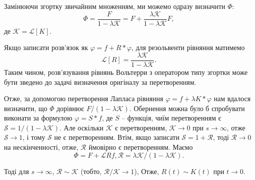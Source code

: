 \documentclass[14pt,twoside]{extreport}
\theoremstyle{mystyle}
\numberwithin{equation}{chapter}
\begin{document}
Замінюючи згортку звичайним множенням, ми можемо одразу визначити $\Phi$:
\begin{equation*}
	\Phi=\dfrac{F}{1-\lambda\mathcal{K}} = F + \dfrac{\lambda\mathcal{K}}{1-\lambda\mathcal{K}}F,
\end{equation*}
де $\mathcal{K}=\mathcal{L}[K]$.

Якщо записати розв'язок як $\varphi = f + R*\varphi$, для резольвенти рівняння матимемо
\begin{equation*}
	\mathcal{L}[R]=\dfrac{\lambda\mathcal{K}}{1-\lambda\mathcal{K}}.
\end{equation*}
Таким чином, розв'язування рівнянь Вольтерри з оператором типу згортки може бути зведено до задачі визначення оригіналу за перетворенням.

Отже, за допомогою перетворення Лапласа рівняння $\varphi=f+\lambda K*\varphi$ нам вдалося визначити, що $\Phi$ дорівнює $F/(1-\lambda\mathcal{K})$. Обернення можна було б спробувати виконати за формулою $\varphi=S*f$, де $S$ -- функція, чиїм перетворенням є $\mathcal{S}=1/(1-\lambda\mathcal{K})$. Але оскільки $\mathcal{K}$ є перетворенням, $\mathcal{K}\to  0$ при $ s\to \infty$, отже $\mathcal{S}\to  1$, і тому $\mathcal{S}$ не є перетворенням. Втім, якщо записати $\mathcal{S}=1+\mathcal{R}$, тоді $\mathcal{R}\to  0$ на нескінченності, отже, $\mathcal{R}$ ймовірно є перетворенням. Маємо
\begin{equation*}
	\Phi=F+\mathcal{L}{Rf}, \mathcal{R}=\lambda\mathcal{K}/(1-\lambda\mathcal{K}).
\end{equation*}

Тоді для $s\to \infty$, $\mathcal{R}\sim\mathcal{K}$ (тобто, $\mathcal{R}/\mathcal{K}\to  1$), Отже, $R(t)\sim K(t)$ при $t\to  0$.
\end{document}
